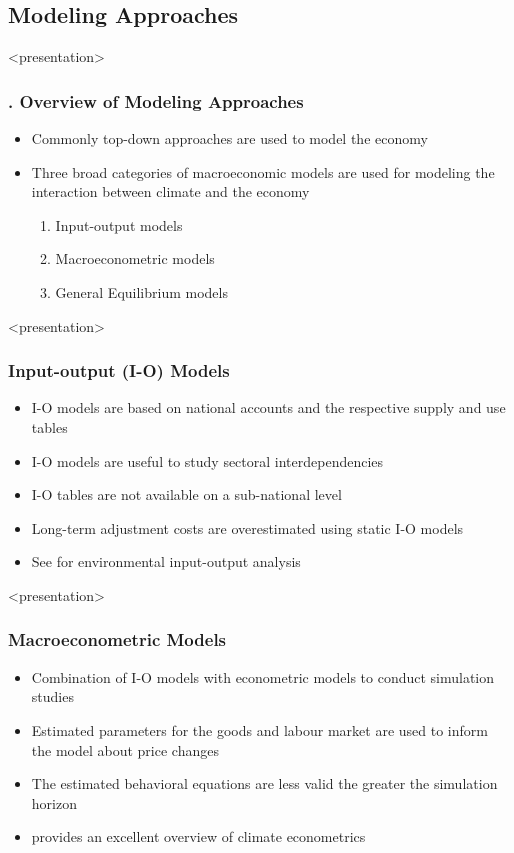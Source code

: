 \documentclass[11pt,aspectratio=169]{beamer}
\begin{document}
\subsection{Modeling Approaches}

\begin{frame}<presentation>
	\frametitle{{\thesection.\thesubsection} Overview of Modeling Approaches}
	\begin{itemize}	
	\item Commonly top-down approaches are used to model the economy
	\item Three broad categories of macroeconomic models are used for modeling the interaction between climate and the economy
	\begin{enumerate}
		\item Input-output models 
		\item Macroeconometric models
		\item General Equilibrium models
	\end{enumerate}
	\end{itemize}	
\end{frame}

\begin{frame}<presentation>
	\frametitle{Input-output (I-O) Models}
	
	\begin{itemize}	
	
	\item I-O models are based on national accounts and the respective supply and use tables	
	\item I-O models are useful to study sectoral interdependencies
	\item I-O tables are not available on a sub-national level
	\item Long-term adjustment costs are overestimated using static I-O models
	\item See \cite{miller2009input} for environmental input-output analysis
	\end{itemize}	
\end{frame}



\begin{frame}<presentation>
	\frametitle{Macroeconometric Models}
	\begin{itemize}
	
		\item Combination of I-O models with econometric models to conduct simulation studies 
		\item Estimated parameters for the goods and labour market are used to inform the model about price changes
		\item The estimated behavioral equations are less valid the greater the simulation horizon
		\item \cite{hsiang2016climate} provides an excellent overview of climate econometrics
	\end{itemize}
\end{frame}
\end{document}
